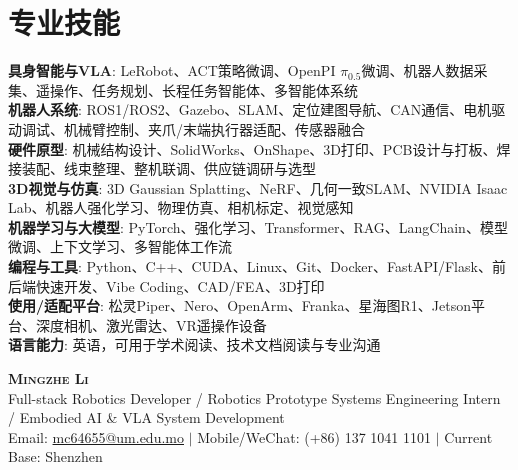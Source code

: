 \documentclass[letterpaper,12pt]{article}
\begin{document}
\section{专业技能}
 \begin{itemize}[leftmargin=0.15in, label={}]
    \small{\item{
     \textbf{具身智能与VLA}{: LeRobot、ACT策略微调、OpenPI $\pi_{0.5}$微调、机器人数据采集、遥操作、任务规划、长程任务智能体、多智能体系统} \\
     \textbf{机器人系统}{: ROS1/ROS2、Gazebo、SLAM、定位建图导航、CAN通信、电机驱动调试、机械臂控制、夹爪/末端执行器适配、传感器融合} \\
     \textbf{硬件原型}{: 机械结构设计、SolidWorks、OnShape、3D打印、PCB设计与打板、焊接装配、线束整理、整机联调、供应链调研与选型} \\
     \textbf{3D视觉与仿真}{: 3D Gaussian Splatting、NeRF、几何一致SLAM、NVIDIA Isaac Lab、机器人强化学习、物理仿真、相机标定、视觉感知} \\
     \textbf{机器学习与大模型}{: PyTorch、强化学习、Transformer、RAG、LangChain、模型微调、上下文学习、多智能体工作流} \\
     \textbf{编程与工具}{: Python、C++、CUDA、Linux、Git、Docker、FastAPI/Flask、前后端快速开发、Vibe Coding、CAD/FEA、3D打印} \\
     \textbf{使用/适配平台}{: 松灵Piper、Nero、OpenArm、Franka、星海图R1、Jetson平台、深度相机、激光雷达、VR遥操作设备} \\
     \textbf{语言能力}{: 英语，可用于学术阅读、技术文档阅读与专业沟通} \\
    }}
 \end{itemize}



\newpage


\begin{center}
    \textbf{\Huge \scshape Mingzhe Li} \\ \vspace{5pt}
    \small Full-stack Robotics Developer / Robotics Prototype Systems Engineering Intern / Embodied AI \& VLA System Development \\ \vspace{3pt}
    \small Email: \href{mailto:mc64655@um.edu.mo}{mc64655@um.edu.mo} $|$ Mobile/WeChat: (+86) 137 1041 1101 $|$ Current Base: Shenzhen \\
\end{center}
\end{document}
